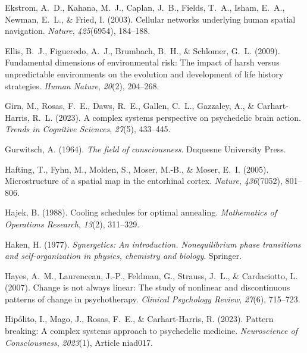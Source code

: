 \documentclass[12pt,fleqn]{article}
\begin{document}
\begin{thebibliography}{}
  Ekstrom, A.~D., Kahana, M.~J., Caplan, J.~B., Fields, T.~A., Isham, E.~A., Newman, E.~L., \& Fried, I. (2003).
  Cellular networks underlying human spatial navigation.
  \emph{Nature}, \emph{425}(6954), 184--188.

  Ellis, B.~J., Figueredo, A.~J., Brumbach, B.~H., \& Schlomer, G.~L. (2009).
  Fundamental dimensions of environmental risk: The impact of harsh versus unpredictable environments on the evolution and development of life history strategies.
  \emph{Human Nature}, \emph{20}(2), 204--268.

  Girn, M., Rosas, F.~E., Daws, R.~E., Gallen, C.~L., Gazzaley, A., \& Carhart-Harris, R.~L. (2023).
  A complex systems perspective on psychedelic brain action.
  \emph{Trends in Cognitive Sciences}, \emph{27}(5), 433--445.

  Gurwitsch, A. (1964).
  \emph{The field of consciousness}.
  Duquesne University Press.

  Hafting, T., Fyhn, M., Molden, S., Moser, M.-B., \& Moser, E.~I. (2005).
  Microstructure of a spatial map in the entorhinal cortex.
  \emph{Nature}, \emph{436}(7052), 801--806.

  Hajek, B. (1988).
  Cooling schedules for optimal annealing.
  \emph{Mathematics of Operations Research}, \emph{13}(2), 311--329.

  Haken, H. (1977).
  \emph{Synergetics: An introduction. Nonequilibrium phase transitions and self-organization in physics, chemistry and biology}.
  Springer.

  Hayes, A.~M., Laurenceau, J.-P., Feldman, G., Strauss, J.~L., \& Cardaciotto, L. (2007).
  Change is not always linear: The study of nonlinear and discontinuous patterns of change in psychotherapy.
  \emph{Clinical Psychology Review}, \emph{27}(6), 715--723.

  Hip\'olito, I., Mago, J., Rosas, F.~E., \& Carhart-Harris, R. (2023).
  Pattern breaking: A complex systems approach to psychedelic medicine.
  \emph{Neuroscience of Consciousness}, \emph{2023}(1), Article niad017.


\end{thebibliography}
\end{document}
